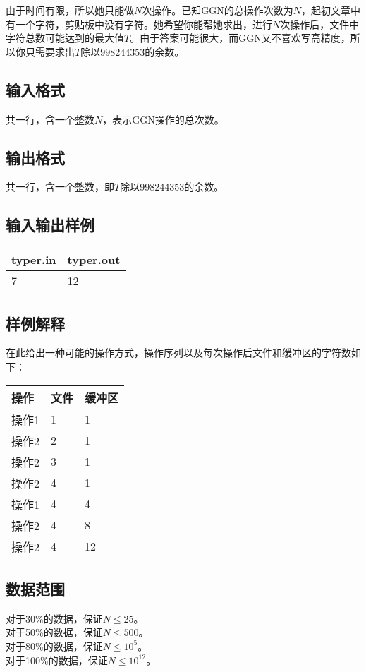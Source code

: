 \documentclass[12pt]{ctexart}
\begin{document}
由于时间有限，所以她只能做$N$次操作。已知GGN的总操作次数为$N$，起初文章中有一个字符，剪贴板中没有字符。她希望你能帮她求出，进行$N$次操作后，文件中字符总数可能达到的最大值$T$。由于答案可能很大，而GGN又不喜欢写高精度，所以你只需要求出$T$除以$998244353$的余数。
\subsection{输入格式}
共一行，含一个整数$N$，表示GGN操作的总次数。
\subsection{输出格式}
共一行，含一个整数，即$T$除以998244353的余数。
\subsection{输入输出样例}
\begin{center}
	\begin{tabular}{|p{6cm}|p{6cm}|}
		\hline typer.in&typer.out\\
		\hline7&12\\
		\hline
	\end{tabular}
\end{center}
\subsection{样例解释}
在此给出一种可能的操作方式，操作序列以及每次操作后文件和缓冲区的字符数如下：
\begin{center}
	\begin{tabular}{|p{4cm}|p{4cm}|p{4cm}|}
		\hline 操作&文件&缓冲区\\
		\hline 操作1&1&1\\
		\hline 操作2&2&1\\
		\hline 操作2&3&1\\
		\hline 操作2&4&1\\
		\hline 操作1&4&4\\
		\hline 操作2&4&8\\
		\hline 操作2&4&12\\
		\hline
	\end{tabular}
\end{center}
\subsection{数据范围}
\noindent 对于30\%的数据，保证$N\leq25$。\\
对于50\%的数据，保证$N\leq500$。\\
对于80\%的数据，保证$N\leq10^5$。\\
对于100\%的数据，保证$N\leq10^{12}$。
\end{document}
